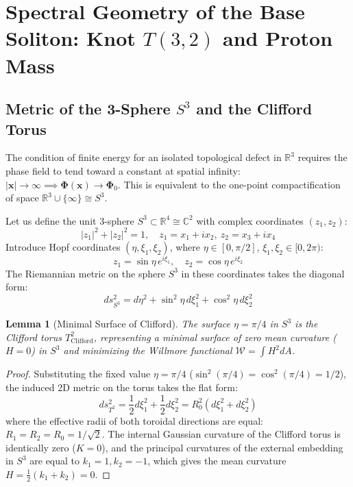 \documentclass[12pt,a4paper]{article}
\newtheorem{lemma}{Lemma}
\begin{document}
	\section{Spectral Geometry of the Base Soliton: Knot $T(3,2)$ and Proton Mass}
	
	\subsection{Metric of the 3-Sphere $S^3$ and the Clifford Torus}
	The condition of finite energy for an isolated topological defect in $\mathbb{R}^3$ requires the phase field to tend toward a constant at spatial infinity: $|\mathbf{x}| \to \infty \implies \boldsymbol{\Phi}(\mathbf{x}) \to \boldsymbol{\Phi}_0$. This is equivalent to the one-point compactification of space $\mathbb{R}^3 \cup \{\infty\} \cong S^3$.
	
	Let us define the unit 3-sphere $S^3 \subset \mathbb{R}^4 \cong \mathbb{C}^2$ with complex coordinates $(z_1, z_2)$:
	\begin{equation}
		|z_1|^2 + |z_2|^2 = 1, \quad z_1 = x_1 + i x_2, \ z_2 = x_3 + i x_4
	\end{equation}
	Introduce Hopf coordinates $(\eta, \xi_1, \xi_2)$, where $\eta \in [0, \pi/2]$, $\xi_1, \xi_2 \in [0, 2\pi)$:
	\begin{equation}
		z_1 = \sin\eta \, e^{i\xi_1}, \quad z_2 = \cos\eta \, e^{i\xi_2}
	\end{equation}
	The Riemannian metric on the sphere $S^3$ in these coordinates takes the diagonal form:
	\begin{equation}
		ds^2_{S^3} = d\eta^2 + \sin^2\eta \, d\xi_1^2 + \cos^2\eta \, d\xi_2^2
	\end{equation}
	
	\begin{lemma}[Minimal Surface of Clifford]
		The surface $\eta = \pi/4$ in $S^3$ is the Clifford torus $T^2_{\mathrm{Clifford}}$, representing a minimal surface of zero mean curvature ($H=0$) in $S^3$ and minimizing the Willmore functional $\mathcal{W} = \int H^2 dA$.
	\end{lemma}
	
	\begin{proof}
		Substituting the fixed value $\eta = \pi/4$ ($\sin^2(\pi/4) = \cos^2(\pi/4) = 1/2$), the induced 2D metric on the torus takes the flat form:
		\begin{equation}
			ds^2_{T^2} = \frac{1}{2} d\xi_1^2 + \frac{1}{2} d\xi_2^2 = R_0^2 (d\xi_1^2 + d\xi_2^2)
		\end{equation}
		where the effective radii of both toroidal directions are equal: $R_1 = R_2 = R_0 = 1/\sqrt{2}$. The internal Gaussian curvature of the Clifford torus is identically zero ($K=0$), and the principal curvatures of the external embedding in $S^3$ are equal to $k_1 = 1, k_2 = -1$, which gives the mean curvature $H = \frac{1}{2}(k_1 + k_2) = 0$.
	\end{proof}
	
\end{document}

